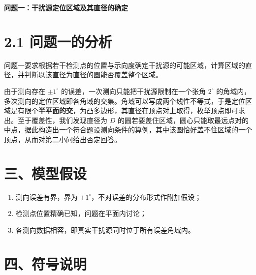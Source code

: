 \documentclass[UTF8,a4paper,zihao=-4,fontset=fandol]{ctexart}
\begin{document}
\thispagestyle{plain}
\begin{center}{\LARGE\bfseries 问题一：干扰源定位区域及其直径的确定\par}\end{center}
\vspace{0.4em}

\section*{2.1 问题一的分析}

问题一要求根据若干检测点的位置与示向度确定干扰源的可能区域，计算区域的直径，并判断以该直径为直径的圆能否覆盖整个区域。

由于测向存在 $\pm 1^\circ$ 的误差，一次测向只能把干扰源限制在一个张角 $2^\circ$ 的角域内，多次测向的定位区域即各角域的交集。角域可以写成两个线性不等式，于是定位区域是有限个\textbf{半平面的交}，为凸多边形，其直径在顶点对上取得，枚举顶点即可求出。至于覆盖性，我们发现直径为 $D$ 的圆若要盖住区域，圆心只能取最远点对的中点，据此构造出一个符合题设测向条件的算例，其中该圆恰好盖不住区域的一个顶点，从而对第二小问给出否定回答。

\section*{三、模型假设}

\begin{enumerate}
\item 测向误差有界，界为 $\pm 1^\circ$，不对误差的分布形式作附加假设；
\item 检测点位置精确已知，问题在平面内讨论；
\item 各测向数据相容，即真实干扰源同时位于所有误差角域内。
\end{enumerate}

\section*{四、符号说明}
\end{document}

